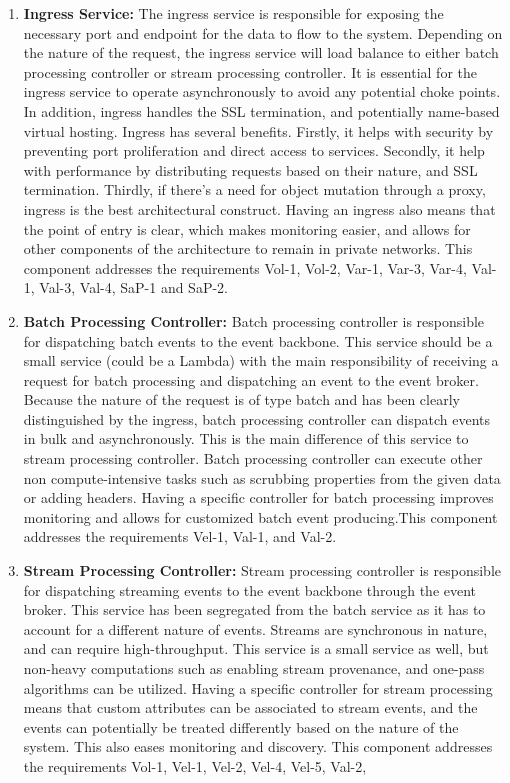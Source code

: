 \documentclass[review]{elsarticle}
\begin{document}
\begin{enumerate}
    \item \textbf{Ingress Service:} The ingress service is responsible for exposing the necessary port and endpoint for the data to flow to the system. Depending on the nature of the request, the ingress service will load balance to either batch processing controller or stream processing controller. It is essential for the ingress service to operate asynchronously to avoid any potential choke points. In addition, ingress handles the SSL termination, and potentially name-based virtual hosting. Ingress has several benefits. Firstly, it helps with security by preventing port proliferation and direct access to services. Secondly, it help with performance by distributing requests based on their nature, and SSL termination. Thirdly, if there's a need for object mutation through a proxy, ingress is the best architectural construct. Having an ingress also means that the point of entry is clear, which makes monitoring easier, and allows for other components of the architecture to remain in private networks. This component addresses the
    requirements Vol-1, Vol-2, Var-1, Var-3, Var-4, Val-1,
    Val-3, Val-4, SaP-1 and SaP-2.
    \item \textbf{Batch Processing Controller:} Batch processing controller is responsible for dispatching batch events to the event backbone. This service should be a small service (could be a Lambda) with the main responsibility of receiving a request for batch processing and dispatching an event to the event broker. Because the nature of the request is of type batch and has been clearly distinguished by the ingress, batch processing controller can dispatch events in bulk and asynchronously. This is the main difference of this service to stream processing controller. Batch processing controller can execute other non compute-intensive tasks such as scrubbing properties from the given data or adding headers. Having a specific controller for batch processing improves monitoring and allows for customized batch event producing.This component addresses the requirements Vel-1, Val-1, and Val-2.
    \item \textbf{Stream Processing Controller:} Stream processing controller is responsible for dispatching streaming events to the event backbone through the event broker. This service has been segregated from the batch service as it has to account for a different nature of events. Streams are synchronous in nature, and can require high-throughput. This service is a small service as well, but non-heavy computations such as enabling stream provenance, and one-pass algorithms can be utilized. Having a specific controller for stream processing means that custom attributes can be associated to stream events, and the events can potentially be treated differently based on the nature of the system. This also eases monitoring and discovery. This component addresses the requirements Vol-1, Vel-1, Vel-2, Vel-4, Vel-5, Val-2,

\end{enumerate}
\end{document}
